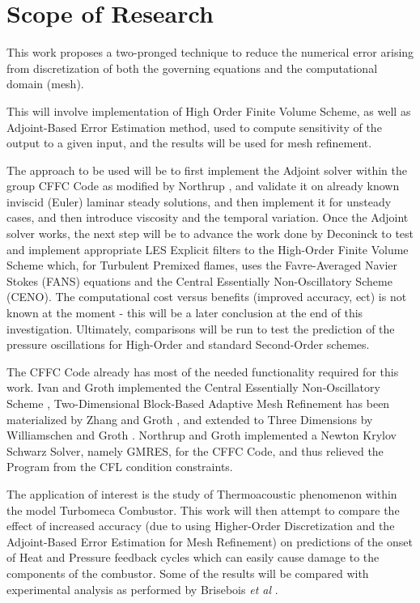 \section{Scope of Research}
This work proposes a two-pronged technique to reduce the numerical error arising from discretization of both the governing equations and the computational domain (mesh).\par

This will involve implementation of High Order Finite Volume Scheme, as well as Adjoint-Based Error Estimation method, used to compute sensitivity of the output to a given input, and the results will be used for mesh refinement. \par

The approach to be used will be to first implement the Adjoint solver within the group CFFC Code as modified by Northrup \cite{Northrup:2013}, and validate it on already known inviscid (Euler) laminar steady solutions, and then implement it for unsteady cases, and then introduce viscosity and the temporal variation. Once the Adjoint solver works, the next step will be to advance the work done by Deconinck to test and implement appropriate LES Explicit filters \cite{Deconinck:2008} to the High-Order Finite Volume Scheme which, for Turbulent Premixed flames, uses the Favre-Averaged Navier Stokes (FANS) equations and the Central Essentially Non-Oscillatory Scheme (CENO). The computational cost versus benefits (improved accuracy, ect) is not known at the moment - this will be a later conclusion at the end of this investigation. Ultimately, comparisons will be run to test the prediction of the pressure oscillations for High-Order and standard Second-Order schemes.\par

The CFFC Code already has most of the needed functionality required for this work. Ivan and Groth implemented the Central Essentially Non-Oscillatory Scheme \cite{ivan:2007b}, Two-Dimensional Block-Based Adaptive Mesh Refinement has been materialized by Zhang and Groth \cite{Zhang:2011a}, and extended to Three Dimensions by Williamschen and Groth \cite{Williamschen:2013}. Northrup and Groth \cite{Northrup:2013} implemented a Newton Krylov Schwarz Solver, namely GMRES, for the CFFC Code, and thus relieved the Program from the CFL condition constraints.\par

The application of interest is the study of Thermoacoustic phenomenon within the model Turbomeca Combustor. This work will then attempt to compare the effect of increased accuracy (due to using Higher-Order Discretization and the Adjoint-Based Error Estimation for Mesh Refinement) on predictions of the onset of Heat and Pressure feedback cycles which can easily cause damage to the components of the combustor. Some of the results will be compared with experimental analysis as performed by Brisebois \textit{et al} \cite{Brisebois:2014}. \par
